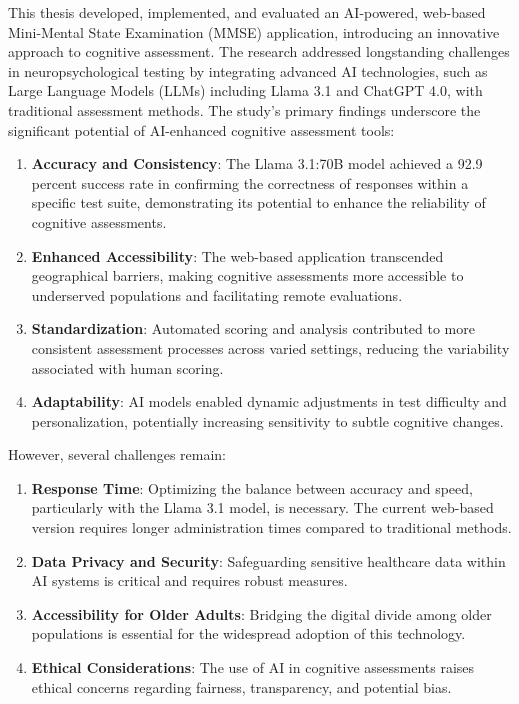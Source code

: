 This thesis developed, implemented, and evaluated an AI-powered, web-based Mini-Mental State Examination (MMSE) application, introducing an innovative approach to cognitive assessment. The research addressed longstanding challenges in neuropsychological testing by integrating advanced AI technologies, such as Large Language Models (LLMs) including Llama 3.1 and ChatGPT 4.0, with traditional assessment methods.
The study's primary findings underscore the significant potential of AI-enhanced cognitive assessment tools:
\begin{enumerate}
\item \textbf{Accuracy and Consistency}: The Llama 3.1:70B model achieved a 92.9 percent success rate in confirming the correctness of responses within a specific test suite, demonstrating its potential to enhance the reliability of cognitive assessments.
\item \textbf{Enhanced Accessibility}: The web-based application transcended geographical barriers, making cognitive assessments more accessible to underserved populations and facilitating remote evaluations.
\item \textbf{Standardization}: Automated scoring and analysis contributed to more consistent assessment processes across varied settings, reducing the variability associated with human scoring.
\item \textbf{Adaptability}: AI models enabled dynamic adjustments in test difficulty and personalization, potentially increasing sensitivity to subtle cognitive changes.
\end{enumerate}
However, several challenges remain:
\begin{enumerate}
\item \textbf{Response Time}: Optimizing the balance between accuracy and speed, particularly with the Llama 3.1 model, is necessary. The current web-based version requires longer administration times compared to traditional methods.
\item \textbf{Data Privacy and Security}: Safeguarding sensitive healthcare data within AI systems is critical and requires robust measures.
\item \textbf{Accessibility for Older Adults}: Bridging the digital divide among older populations is essential for the widespread adoption of this technology.
\item \textbf{Ethical Considerations}: The use of AI in cognitive assessments raises ethical concerns regarding fairness, transparency, and potential bias.
\end{enumerate}
